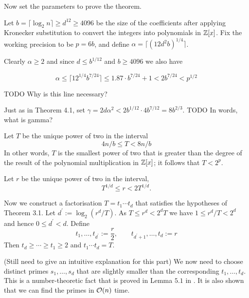 \medskip

Now set the parameters to prove the theorem.

Let $b = \lceil \log_2 n\rceil \geq d^{12} \geq 4096$ be the size of the coefficients after applying Kronecker substitution to convert the integers into polynomials in ${\mathbb Z}[x]$. Fix the working precision to be $p = 6b$, and define $\alpha = \lceil (12d^2 b)^{1/4}\rceil$.

Clearly $\alpha \geq 2$ and since $d \leq b^{1/12}$ and $b \geq 4096$ we also have

\begin{equation}
    \alpha \leq \lceil 12^{1/4} b^{7/24}\rceil \leq 1.87 \cdot b^{7/24} + 1 < 2b^{7/24} < p^{1/2}
\end{equation}

TODO Why is this line necessary?

Just as in Theorem 4.1, set $\gamma = 2d\alpha^2 < 2b^{1/12} \cdot 4b^{7/12} = 8b^{2/3}$.
TODO In words, what is gamma?

Let $T$ be the unique power of two in the interval
\begin{equation}
    4n/b \leq T < 8n/b
\end{equation}
In other words, $T$ is the smallest power of two that is greater than the degree of the result of the polynomial multiplication in ${\mathbb Z}[x]$; it follows that $T < 2^p$.

Let $r$ be the unique power of two in the interval,
\[
    T^{1/d} \leq r < 2T^{1/d}.
\]


Now we construct a factorisation $T = t_1 \cdots t_d$ that satisfies the hypotheses of Theorem 3.1. Let $d^\prime := \log_2(r^d / T)$. As $T \leq r^d < 2^d T$ we have $1 \leq r^d / T < 2^d$ and hence $0 \leq d^\prime < d$. Define
\[
    t_1, \ldots, t_{d^\prime} := \frac{r}{2}, \qquad t_{d^\prime + 1} , \ldots, t_d := r
\]
Then $t_d \geq \cdots \geq t_1 \geq 2$ and $t_1\cdots t_d = T$.

\medskip


\medskip

(Still need to give an intuitive explanation for this part)
We now need to choose distinct primes $s_1, \ldots, s_d$ that are slightly smaller than the corresponding $t_1, \ldots, t_d$. This is a number-theoretic fact that is proved in Lemma $5.1$ in \cite{nlogn}. It is also shown that we can find the primes in $\mathcal O(n)$ time.

